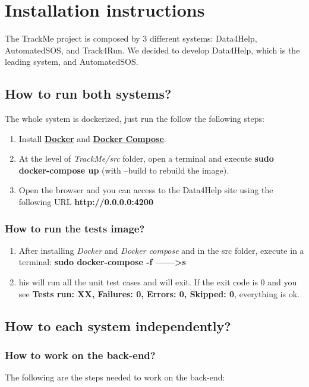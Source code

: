 \documentclass[a4paper, hidelinks, 12pt]{report}
\begin{document}
	\chapter{Installation instructions}
The TrackMe project is composed by 3 different systems: Data4Help, AutomatedSOS, and Track4Run. We decided to develop Data4Help, which is the leading system, and AutomatedSOS.

	\section{How to run both systems?}
	The whole system is dockerized, just run the follow the following steps:

	\begin{enumerate}
	\item Install \href{https://docs.docker.com/install/}{\textbf{Docker}} and \href{https://docs.docker.com/compose/install/}{\textbf{Docker Compose}}.
	\item At the level of \textit{TrackMe/src} folder, open a terminal and execute
	\textbf{ sudo docker-compose up} (with --build to rebuild the image).
	\item Open the browser and you can access to the Data4Help site using the following URL
		\textbf{http://0.0.0.0:4200}
	\end{enumerate}
	
	\subsection{How to run the tests image?}
	\begin{enumerate}
	\item After installing \textit{Docker} and \textit{Docker compose} and in the src folder, execute in a terminal: 
	\textbf{sudo docker-compose -f  ------>s}
	\item his will run all the unit test cases and will exit. If the exit code is 0 and you see \textbf{Tests run: XX, Failures: 0, Errors: 0, Skipped: 0}, everything is ok.
	\end{enumerate}
	 
	\section{How to each system independently?}
	\subsection{How to work on the back-end?}
	The following are the steps needed to work on the back-end:
	
\end{document}

